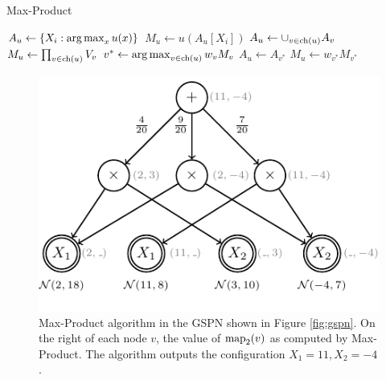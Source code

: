 \begin{algorithm}[h]
  \caption{Max-Product}
  \label{alg:maxproduct}
  \begin{algorithmic}
  \end{algorithmic}
  \begin{algorithmic}[1]
    \State $A_u \gets \{X_i: \operatorname*{arg\,max}_{x} u(x)\}$ 
    \State $M_u \gets u(A_u[X_i])$
    \State $A_u \gets \cup_{v \in \operatorname*{ch}(u)} A_v$
    \State $M_u \gets \prod_{v \in \operatorname*{ch}(u)} V_v$
    \State $v^* \gets \operatorname*{arg\,max}_{v \in \operatorname*{ch}(u)} w_v M_v$ \label{alg:maxproduct:sum}
    \State $A_u \gets A_{v^*}$
    \State $M_u \gets w_{v^*} M_{v^*}$
    \EndIf
    \EndFor
    \State {}
  \end{algorithmic}
\end{algorithm}

\begin{figure}
  \centering
  \includegraphics{figures/maxproduct.pdf}

  \caption[Illustration of Max-Product]{
    Max-Product algorithm in the GSPN shown in Figure \ref{fig:gspn}. On the right of each node $v$, the value of $\operatorname*{map}_2(v)$ as computed by Max-Product. The algorithm outputs the configuration $X_1=11, X_2=-4$.
  }

  \label{fig:maxproduct}
\end{figure}

